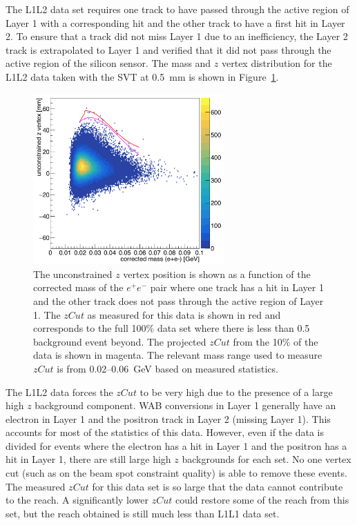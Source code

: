 The L1L2 data set requires one track to have passed through the active region of Layer 1 with a corresponding hit and the other track to have a first hit in Layer 2. To ensure that a track did not miss Layer 1 due to an inefficiency, the Layer 2 track is extrapolated to Layer 1 and verified that it did not pass through the active region of the silicon sensor. The mass and $z$ vertex distribution for the L1L2 data taken with the SVT at 0.5~mm is shown in Figure~\ref{fig:zvm_l1l2}.
\begin{figure}[htb]
  \centering
      \includegraphics[width=0.65\textwidth]{pics/appendix/zVm_ub_L1L2.png}
  \caption[$z$ vertex and mass distribution for the L1L2 data set with the SVT at $\pm0.5$~mm]{The unconstrained $z$ vertex position is shown as a function of the corrected mass
of the $e^+e^-$ pair where one track has a hit in Layer 1 and the other track does not pass through the active region of Layer 1. The $zCut$ as measured for this data is shown in red
and corresponds to the full 100$\%$ data set where there is less than 0.5 background event beyond. The projected $zCut$ from the 10$\%$ of the data is shown in magenta. The relevant mass range used to measure $zCut$ is from 0.02--0.06~GeV based on measured statistics.}
  \label{fig:zvm_l1l2}
\end{figure}
The L1L2 data forces the $zCut$ to be very high due to the presence of a large high $z$ background component. WAB conversions in Layer 1 generally have an electron in Layer 1 and the positron track in Layer 2 (missing Layer 1). This accounts for most of the statistics of this data. However, even if the data is divided for events where the electron has a hit in Layer 1 and the positron has a hit in Layer 1, there are still large high $z$ backgrounds for each set. No one vertex cut (such as on the beam spot constraint quality) is able to remove these events. The measured $zCut$ for this data set is so large that the data cannot contribute to the reach. A significantly lower $zCut$ could restore some of the reach from this set, but the reach obtained is still much less than L1L1 data set. \\
